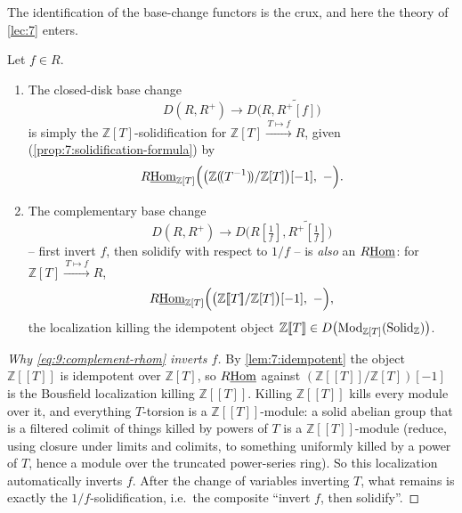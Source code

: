 The identification of the base-change functors is the crux, and here the theory
of \cref{lec:7} enters.

\begin{lemma}
\label{lem:9:base-change-rhom}
Let $f\in R$.
\begin{enumerate}
\item The closed-disk base change
\begin{equation*}
D(R,R^{+})\longrightarrow D\bigl(R,\widetilde{R^{+}[f]}\bigr)
\end{equation*}
is simply the $\mathbb{Z}[T]$-solidification for $\mathbb{Z}[T]\xrightarrow{\,
T\mapsto f\,}R$, given (\cref{prop:7:solidification-formula}) by
\begin{equation*}
R\underline{\operatorname{Hom}}_{\mathbb{Z}[T]}\Bigl(\bigl(\mathbb{Z}(\!(T^{-1})\!)/\mathbb{Z}[T]\bigr)
[-1],\ -\Bigr).
\end{equation*}
\item The complementary base change
\begin{equation*}
D(R,R^{+})\longrightarrow D\bigl(R[\tfrac1f],\widetilde{R^{+}[\tfrac1f]}\bigr)
\end{equation*}
-- first invert $f$, then solidify with respect to $1/f$ -- is \emph{also} an
$R\underline{\operatorname{Hom}}$: for $\mathbb{Z}[T]\xrightarrow{\,T\mapsto f\,}R$,
\begin{equation}
\label{eq:9:complement-rhom}
R\underline{\operatorname{Hom}}_{\mathbb{Z}[T]}\Bigl(\bigl(\mathbb{Z}[\![T]\!]/\mathbb{Z}[T]\bigr)[-1],\
-\Bigr),
\end{equation}
the localization killing the idempotent object $\mathbb{Z}[\![T]\!]\in
D\bigl(\operatorname{Mod}_{\mathbb{Z}[T]}(\mathrm{Solid}_{\mathbb{Z}})\bigr)$.
\end{enumerate}
\end{lemma}

\begin{proof}[Why \eqref{eq:9:complement-rhom} inverts $f$]
By \cref{lem:7:idempotent} the object $\mathbb{Z}[\![T]\!]$ is idempotent over
$\mathbb{Z}[T]$, so $R\underline{\operatorname{Hom}}$ against $(\mathbb{Z}[\![T]\!]/\mathbb{Z}[T])[-1]$ is
the Bousfield localization killing $\mathbb{Z}[\![T]\!]$. Killing
$\mathbb{Z}[\![T]\!]$ kills every module over it, and everything $T$-torsion is a
$\mathbb{Z}[\![T]\!]$-module: a solid abelian group that is a filtered colimit of
things killed by powers of $T$ is a $\mathbb{Z}[\![T]\!]$-module (reduce, using
closure under limits and colimits, to something uniformly killed by a power of
$T$, hence a module over the truncated power-series ring). So this localization
automatically inverts $f$. After the change of variables inverting $T$, what
remains is exactly the $1/f$-solidification, i.e.\ the composite ``invert $f$,
then solidify''.
\end{proof}

